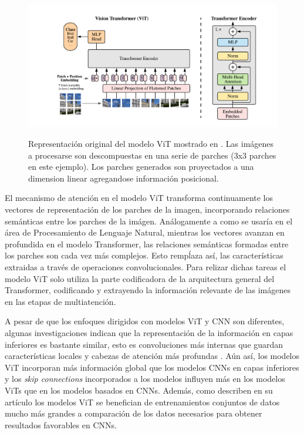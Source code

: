 {\begin{figure}[htp]
    \centering
    {\includegraphics[width=1.0\textwidth]{Chapters/4. ViT-Lung/images/ViT.png}}
\caption{Representación original del modelo ViT mostrado en \cite{DBLP:journals/corr/abs-2010-11929}.
Las imágenes a procesarse son descompuestas en una serie de parches (3x3 parches en este ejemplo). Los
parches generados son proyectados a una dimension linear agregandose información posicional.}
\label{fig_ViT}
\end{figure}

El mecanismo de atención en el modelo ViT transforma continuamente los vectores de representación de
los parches de la imagen, incorporando relaciones semánticas entre los parches de la imágen.
Análogamente a como se usaría en el área de Procesamiento de Lenguaje Natural, mientras los vectores
avanzan en profundida en el modelo Transformer, las relaciones semánticas formadas entre los parches
son cada vez más complejos. Esto rempĺaza así, las características extraidas a través de operaciones
convolucionales. Para relizar dichas tareas el modelo ViT solo utiliza la parte codificadora de la
arquitectura general del Transformer, codificando y extrayendo la información relevante de las imágenes
en las etapas de multiatención.

A pesar de que los enfoques dirigidos con modelos ViT y CNN son diferentes, algunas investigaciones
indican que la representación de la información en capas inferiores es bastante similar, esto es
convoluciones más internas que guardan características locales y cabezas de atención más profundas
\cite{DBLP:journals/corr/abs-2108-08810}. Aún así, los modelos ViT incorporan más información global
que los modelos CNNs en capas inferiores y los \textit{skip connections} incorporados a los modelos
influyen más en los modelos ViTs
que en los modelos basados en CNNs. Además, como describen en su artículo \citeauthor{DBLP:journals/corr/abs-2010-11929}
los modelos ViT se benefician de entrenamientos conjuntos de datos mucho más grandes a comparación
de los datos necesarios para obtener resultados favorables en CNNs.

}
